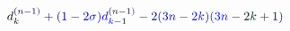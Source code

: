 \documentclass[12pt]{article}
\begin{document}
\makeatletter
\renewcommand*{\@textcolor}[3]{%
  \protect\leavevmode
  \begingroup
    \color#1{#2}#3%
  \endgroup
}
\makeatother
\begin{displaymath}
\mathcolor[RGB]{0,0,15}{d} _ { \mathcolor[RGB]{0,0,30}{k} } ^ { \mathcolor[RGB]{0,0,45}{(} \mathcolor[RGB]{0,0,60}{n} \mathcolor[RGB]{0,0,75}{-} \mathcolor[RGB]{0,0,90}{1} \mathcolor[RGB]{0,0,105}{)} } \mathcolor[RGB]{0,0,120}{+} \mathcolor[RGB]{0,0,135}{(} \mathcolor[RGB]{0,0,150}{1} \mathcolor[RGB]{0,0,165}{-} \mathcolor[RGB]{0,0,180}{2} \mathcolor[RGB]{0,0,195}{\sigma} \mathcolor[RGB]{0,0,210}{)} \mathcolor[RGB]{0,0,225}{d} _ { \mathcolor[RGB]{0,0,240}{k} \mathcolor[RGB]{0,0,255}{-} \mathcolor[RGB]{0,15,0}{1} } ^ { \mathcolor[RGB]{0,15,15}{(} \mathcolor[RGB]{0,15,30}{n} \mathcolor[RGB]{0,15,45}{-} \mathcolor[RGB]{0,15,60}{1} \mathcolor[RGB]{0,15,75}{)} } \mathcolor[RGB]{0,15,90}{-} \mathcolor[RGB]{0,15,105}{2} \mathcolor[RGB]{0,15,120}{(} \mathcolor[RGB]{0,15,135}{3} \mathcolor[RGB]{0,15,150}{n} \mathcolor[RGB]{0,15,165}{-} \mathcolor[RGB]{0,15,180}{2} \mathcolor[RGB]{0,15,195}{k} \mathcolor[RGB]{0,15,210}{)} \mathcolor[RGB]{0,15,225}{(} \mathcolor[RGB]{0,15,240}{3} \mathcolor[RGB]{0,15,255}{n} \mathcolor[RGB]{0,30,0}{-} \mathcolor[RGB]{0,30,15}{2} \mathcolor[RGB]{0,30,30}{k} \mathcolor[RGB]{0,30,45}{+} \mathcolor[RGB]{0,30,60}{1} \mathcolor[RGB]{0,30,75}{)}
\end{displaymath}
\end{document}
